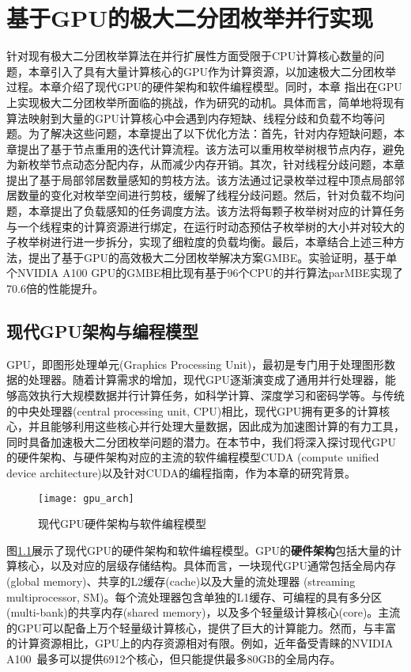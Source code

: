 \chapter{基于GPU的极大二分团枚举并行实现}
\label{ch:gmbe}

针对现有极大二分团枚举算法在并行扩展性方面受限于CPU计算核心数量的问题，本章引入了具有大量计算核心的GPU作为计算资源，以加速极大二分团枚举过程。本章介绍了现代GPU的硬件架构和软件编程模型。同时，本章%
指出在GPU上实现极大二分团枚举所面临的挑战，作为研究的动机。具体而言，简单地将现有算法映射到大量的GPU计算核心中会遇到内存短缺、线程分歧和负载不均等问题。为了解决这些问题，本章提出了以下优化方法：首先，针对内存短缺问题，本章提出了基于节点重用的迭代计算流程。该方法可以重用枚举树根节点内存，避免为新枚举节点动态分配内存，从而减少内存开销。其次，针对线程分歧问题，本章提出了基于局部邻居数量感知的剪枝方法。该方法通过记录枚举过程中顶点局部邻居数量的变化对枚举空间进行剪枝，缓解了线程分歧问题。然后，针对负载不均问题，本章提出了负载感知的任务调度方法。该方法将每颗子枚举树对应的计算任务与一个线程束的计算资源进行绑定，在运行时动态预估子枚举树的大小并对较大的子枚举树进行进一步拆分，实现了细粒度的负载均衡。最后，本章结合上述三种方法，提出了基于GPU的高效极大二分团枚举解决方案GMBE。实验证明，基于单个NVIDIA A100 GPU的GMBE相比现有基于96个CPU的并行算法parMBE实现了70.6倍的性能提升。

\section{现代GPU架构与编程模型} 
GPU，即图形处理单元(Graphics Processing Unit)，最初是专门用于处理图形数据的处理器。随着计算需求的增加，现代GPU逐渐演变成了通用并行处理器，能够高效执行大规模数据并行计算任务，如科学计算、深度学习和密码学等。与传统的中央处理器(central processing unit, CPU)相比，现代GPU拥有更多的计算核心，并且能够利用这些核心并行处理大量数据，因此成为加速图计算的有力工具，同时具备加速极大二分团枚举问题的潜力。在本节中，我们将深入探讨现代GPU的硬件架构、与硬件架构对应的主流的软件编程模型CUDA (compute unified device architecture)以及针对CUDA的编程指南，作为本章的研究背景。

\begin{figure} [t]
  \center
    \vspace{0.1in}
		\texttt{[image: gpu\_arch]}
    \vspace{0.1in}
	\caption{现代GPU硬件架构与软件编程模型}
	\label{fig:gpu}
\end{figure}

图\ref{fig:gpu}展示了现代GPU的硬件架构和软件编程模型。GPU的\textbf{硬件架构}包括大量的计算核心，以及对应的层级存储结构。具体而言，一块现代GPU通常包括全局内存(global memory)、共享的L2缓存(cache)以及大量的流处理器 (streaming multiprocessor, SM)。每个流处理器包含单独的L1缓存、可编程的具有多分区(multi-bank)的共享内存(shared memory)，以及多个轻量级计算核心(core)。主流的GPU可以配备上万个轻量级计算核心，提供了巨大的计算能力。然而，与丰富的计算资源相比，GPU上的内存资源相对有限。例如，近年备受青睐的NVIDIA A100~\cite{NVIDIA-A100}最多可以提供6912个核心，但只能提供最多80GB的全局内存。

